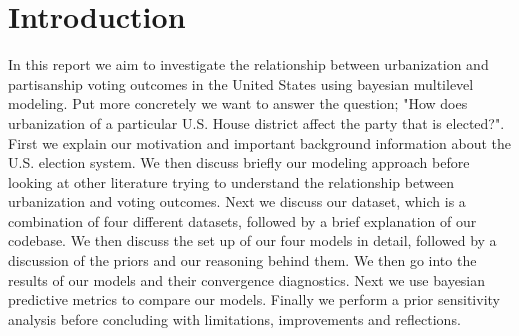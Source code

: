 \documentclass[12pt]{article}
\begin{document}











\thispagestyle{empty} %
\newpage

\tableofcontents
\newpage


\section{Introduction}
 


In this report we aim to investigate the relationship between urbanization and partisanship voting outcomes in the United States using bayesian multilevel modeling. Put more concretely we want to answer the question; "How does urbanization of a particular U.S. House district affect the party that is elected?". First we explain our motivation and important background information about the U.S. election system. 
We then discuss briefly our modeling approach before looking at other literature trying to understand the relationship between urbanization and voting outcomes. 
Next we discuss our dataset, which is a combination of four different datasets, followed by a brief explanation of our codebase. 
We then discuss the set up of our four models in detail, followed by a discussion of the priors and our reasoning behind them. We then go into the results of our models and their convergence diagnostics. Next we use bayesian predictive metrics to compare our models. Finally we perform a prior sensitivity analysis before concluding with limitations, improvements and reflections. 
\end{document}
